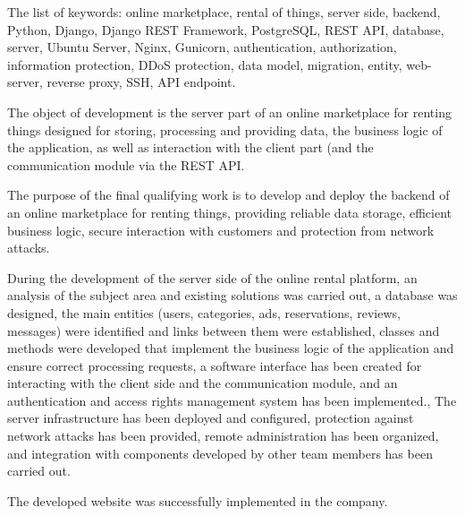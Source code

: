 The list of keywords: online marketplace, rental of things, server side, backend, Python, Django, Django REST Framework, PostgreSQL, REST API, database, server, Ubuntu Server, Nginx, Gunicorn, authentication, authorization, information protection, DDoS protection, data model, migration, entity, web-server, reverse proxy, SSH, API endpoint.

The object of development is the server part of an online marketplace for renting things designed for storing, processing and providing data, the business logic of the application, as well as interaction with the client part (and the communication module via the REST API.

The purpose of the final qualifying work is to develop and deploy the backend of an online marketplace for renting things, providing reliable data storage, efficient business logic, secure interaction with customers and protection from network attacks.

During the development of the server side of the online rental platform, an analysis of the subject area and existing solutions was carried out, a database was designed, the main entities (users, categories, ads, reservations, reviews, messages) were identified and links between them were established, classes and methods were developed that implement the business logic of the application and ensure correct processing requests, a software interface has been created for interacting with the client side and the communication module, and an authentication and access rights management system has been implemented., The server infrastructure has been deployed and configured, protection against network attacks has been provided, remote administration has been organized, and integration with components developed by other team members has been carried out.


The developed website was successfully implemented in the company.
